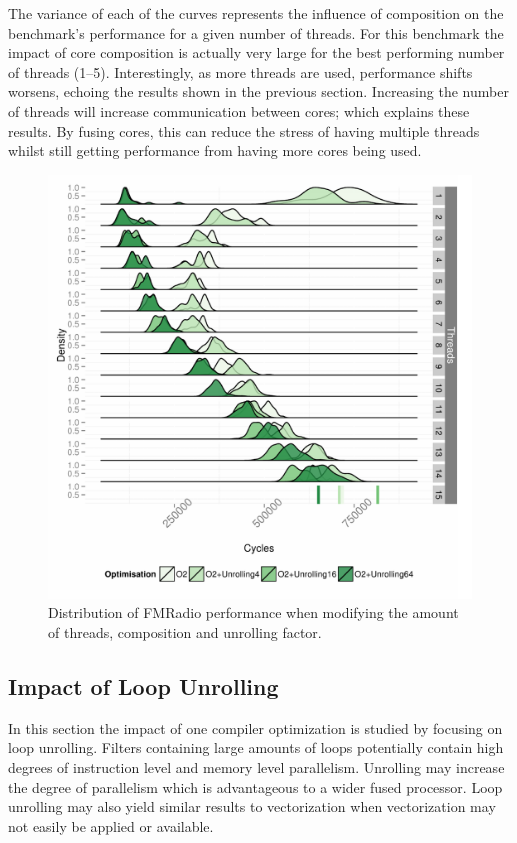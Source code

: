 The variance of each of the curves represents the influence of composition on the benchmark's performance for a given number of threads.
For this benchmark the impact of core composition is actually very large for the best performing number of threads (1--5).
Interestingly, as more threads are used,  performance shifts worsens, echoing the results shown in the previous section.
Increasing the number of threads will increase communication between cores; which explains these results.
By fusing cores, this can reduce the stress of having multiple threads whilst still getting performance from having more cores being used.

\begin{figure}
  \includegraphics[width=1\textwidth]{streamit-paper/graphics/unrolled_fm.pdf}
  \caption{Distribution of FMRadio performance when modifying the amount of threads, composition and unrolling factor.}\label{fig:fmunroll}
\end{figure}

\subsection{Impact of Loop Unrolling}
In this section the impact of one compiler optimization is studied by focusing on loop unrolling.
Filters containing large amounts of loops potentially contain high degrees of instruction level and memory level parallelism.
Unrolling may increase the degree of parallelism which is advantageous to a wider fused processor.
Loop unrolling may also yield similar results to vectorization when vectorization may not easily be applied or available.


